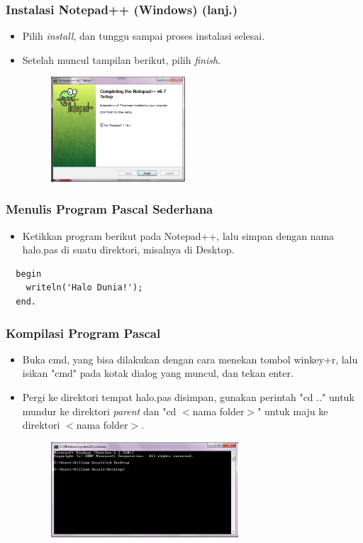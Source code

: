 \begin{frame}
\frametitle{Instalasi Notepad++ (Windows) (lanj.)}
\begin{itemize}
  \item Pilih \textit{install}, dan tunggu sampai proses instalasi selesai.
  \item Setelah muncul tampilan berikut, pilih \textit{finish}.
  \begin{figure}
    \includegraphics[width=5cm]{asset/npp_9.PNG}
  \end{figure}
\end{itemize}
\end{frame}

\begin{frame}[fragile]
\frametitle{Menulis Program Pascal Sederhana}
\begin{itemize}
  \item Ketikkan program berikut pada Notepad++, lalu simpan dengan nama halo.pas di suatu direktori, misalnya di Desktop.
\end{itemize}
\begin{lstlisting}
  begin
    writeln('Halo Dunia!');
  end.
\end{lstlisting}
\end{frame}

\begin{frame}
\frametitle{Kompilasi Program Pascal}
\begin{itemize}
  \item Buka cmd, yang bisa dilakukan dengan cara menekan tombol winkey+r, lalu isikan "cmd" pada kotak dialog yang muncul, dan tekan enter.
  \item Pergi ke direktori tempat halo.pas disimpan, gunakan perintah "cd .." untuk mundur ke direktori \textit{parent} dan "cd $<$nama folder$>$" untuk maju ke direktori $<$nama folder$>$.
  \begin{figure}
    \includegraphics[width=7cm]{asset/hello_2.PNG}
  \end{figure}
\end{itemize}
\end{frame}

